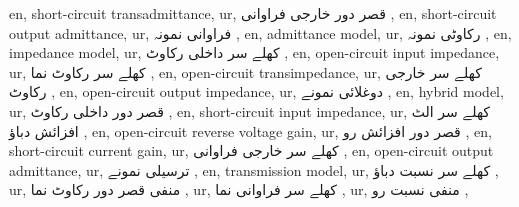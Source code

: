 en, short-circuit transadmittance,
ur, قصر دور خارجی فراوانی ,
en, short-circuit output admittance,
ur, فراوانی نمونہ ,
en, admittance model,
ur, رکاوٹی نمونہ ,
en, impedance model,
ur, کھلے سر داخلی رکاوٹ ,
en, open-circuit input impedance,
ur, کھلے سر رکاوٹ نما ,
en, open-circuit transimpedance,
ur, کھلے سر خارجی رکاوٹ ,
en, open-circuit output impedance,
ur, دوغلائی نمونے ,
en, hybrid model,
ur, قصر دور داخلی رکاوٹ ,
en, short-circuit input impedance,
ur, کھلے سر الٹ افزائش دباؤ ,
en, open-circuit reverse voltage gain,
ur, قصر دور افزائش رو ,
en, short-circuit current gain,
ur, کھلے سر خارجی فراوانی ,
en, open-circuit output admittance,
ur, ترسیلی نمونے ,
en, transmission model,
ur, کھلے سر نسبت دباؤ ,
ur, منفی قصر دور رکاوٹ نما ,
ur, کھلے سر فراوانی نما ,
ur, منفی نسبت رو ,
